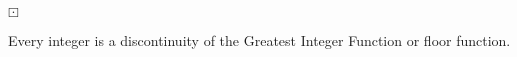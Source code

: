 \documentclass{ximera}
\author{Lee Wayand}
\begin{document}
\begin{exercise}





\begin{question} $\boxdot$ 

Every integer is a discontinuity of the Greatest Integer Function or floor function.


\begin{multipleChoice}
\end{multipleChoice}

\end{question}


\end{exercise}
\end{document}
